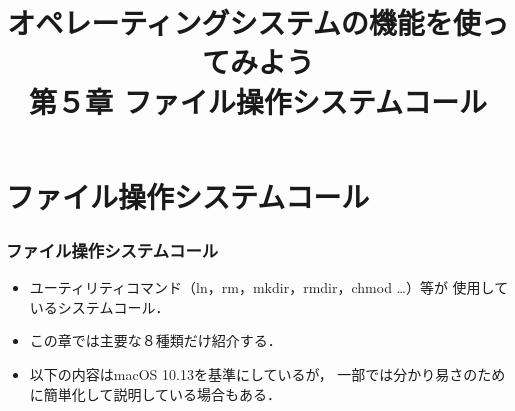 \documentclass{beamer}                 %
\begin{document}
\title{オペレーティングシステムの機能を使ってみよう\\
第５章 ファイル操作システムコール}
\date{}

\begin{frame}
  \titlepage
\end{frame}


\section{ファイル操作システムコール}
\begin{frame}[fragile]
  \frametitle{ファイル操作システムコール}
  \begin{itemize}
    \item ユーティリティコマンド（ln，rm，mkdir，rmdir，chmod …）等が
      使用しているシステムコール．
    \item この章では主要な８種類だけ紹介する．
    \item 以下の内容はmacOS 10.13を基準にしているが，
      一部では分かり易さのために簡単化して説明している場合もある．
  \end{itemize}
\end{frame}
\end{document}
